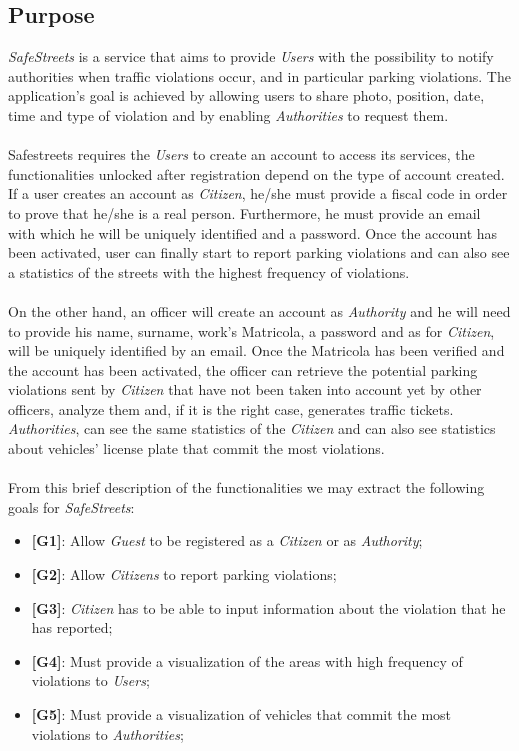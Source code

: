 \documentclass{article}
\begin{document}
\subsection{Purpose}
\textit{SafeStreets} is a service that aims to provide \textit{Users} with the possibility to notify authorities when traffic 
violations occur, and in particular parking violations. The application's goal is achieved by allowing users 
to share photo, position, date, time and type of violation and by enabling \textit{Authorities} to request them.
\\
\\
Safestreets requires the \textit{Users} to create an account to access its services, the functionalities unlocked after 
registration depend on the type of account created.
\\
If a user creates an account as \textit{Citizen}, he/she must provide a fiscal code in order to prove 
that he/she is a real person. Furthermore, he must provide an email with which he will be uniquely identified 
and a password. Once the account has been activated, user can finally start to report parking violations and can also see 
a statistics of the streets with the highest frequency of violations.
\\
\\
On the other hand, an officer will create an account as \textit{Authority} and he will need to provide his name, surname, 
work's Matricola, a password and as for \textit{Citizen}, will be uniquely identified by an email. Once the Matricola 
has been verified and the account has been activated, the officer can retrieve the potential parking violations 
sent by \textit{Citizen} that have not been taken into account yet by other officers, analyze them and, if it is the 
right case, generates traffic tickets. \textit{Authorities}, can see the same statistics of the \textit{Citizen} and can also see
statistics about vehicles' license plate that commit the most violations.
\\
\\
From this brief description of the functionalities we may extract the following goals for \textit{SafeStreets}:
\begin{itemize}
    \item \textbf{[G1]}: Allow \textit{Guest} to be registered as a \textit{Citizen} or as \textit{Authority};
    \item \textbf{[G2]}: Allow \textit{Citizens} to report parking violations;
    \item \textbf{[G3]}: \textit{Citizen} has to be able to input information about the violation that he has reported;
    \item \textbf{[G4]}: Must provide a visualization of the areas with high frequency of violations to \textit{Users};
    \item \textbf{[G5]}: Must provide a visualization of vehicles that commit the most violations to \textit{Authorities}; 

\end{itemize}
\end{document}
